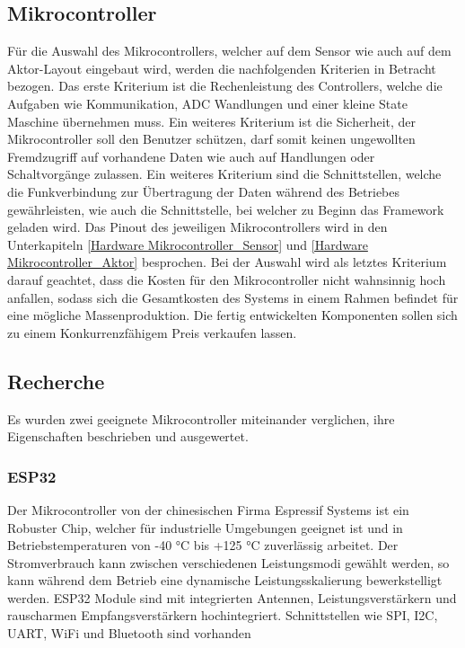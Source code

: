 \subsection{Mikrocontroller}\label{subsec: Mikrocontroller}
Für die Auswahl des Mikrocontrollers, welcher auf dem Sensor wie auch auf dem Aktor-Layout eingebaut wird, werden die nachfolgenden Kriterien in Betracht bezogen. Das erste Kriterium ist die Rechenleistung des Controllers, welche die Aufgaben wie Kommunikation, ADC Wandlungen und einer kleine State Maschine übernehmen muss.
Ein weiteres Kriterium ist die Sicherheit, der Mikrocontroller soll den Benutzer schützen, darf somit keinen ungewollten Fremdzugriff auf vorhandene Daten wie auch auf Handlungen oder Schaltvorgänge zulassen. Ein weiteres Kriterium sind die Schnittstellen, welche die Funkverbindung zur Übertragung der Daten während des Betriebes gewährleisten, wie auch die Schnittstelle, bei welcher zu Beginn das Framework geladen wird. Das Pinout des jeweiligen Mikrocontrollers wird in den Unterkapiteln \ref{Hardware Mikrocontroller_Sensor} und \ref{Hardware Mikrocontroller_Aktor} besprochen. Bei der Auswahl wird als letztes Kriterium darauf geachtet, dass die Kosten für den Mikrocontroller nicht wahnsinnig hoch anfallen, sodass sich die Gesamtkosten des Systems in einem Rahmen befindet für eine mögliche Massenproduktion. Die fertig entwickelten Komponenten sollen sich zu einem Konkurrenzfähigem Preis verkaufen lassen.
\newpage
\subsection{Recherche}\label{subsec: Recherche}
Es wurden zwei geeignete Mikrocontroller miteinander verglichen, ihre Eigenschaften beschrieben und ausgewertet. 

\subsubsection{ESP32}
Der Mikrocontroller von der chinesischen Firma Espressif Systems ist ein Robuster Chip, welcher für industrielle Umgebungen geeignet ist und in Betriebstemperaturen von -40 °C bis +125 °C zuverlässig arbeitet. Der Stromverbrauch kann zwischen verschiedenen Leistungsmodi gewählt werden, so kann während dem Betrieb eine dynamische Leistungsskalierung bewerkstelligt werden. ESP32 Module sind mit integrierten Antennen, Leistungsverstärkern und rauscharmen Empfangsverstärkern hochintegriert. Schnittstellen wie SPI, I2C, UART, WiFi und Bluetooth sind vorhanden

